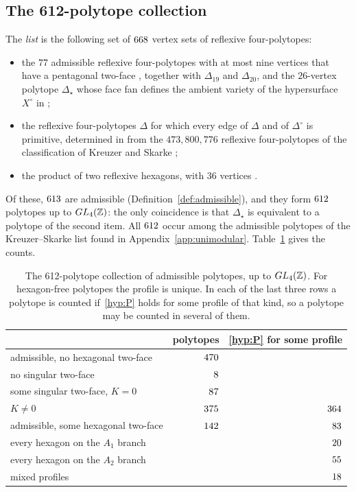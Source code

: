 \subsection{The 612-polytope collection}\label{ssec:list}
The \emph{list} is the following set of $668$ vertex sets of reflexive four-polytopes:
\begin{itemize}
\item the $77$ admissible reflexive four-polytopes with at most nine vertices that have a pentagonal two-face
\cite{Paper4}, together with $\Delta_{19}$ and $\Delta_{20}$, and the $26$-vertex polytope $\Delta_\star$
whose face fan defines the ambient variety of the hypersurface $X^\circ$ in \cite{Paper4};
\item the reflexive four-polytopes $\Delta$ for which every edge of $\Delta$ and of $\Delta^\circ$ is primitive, determined in
\cite{Paper3} from the $473{,}800{,}776$ reflexive four-polytopes of the classification of Kreuzer and Skarke
\cite{KS00};
\item the product of two reflexive hexagons, with $36$ vertices \cite{Paper3}.
\end{itemize}
Of these, $613$ are admissible (Definition~\ref{def:admissible}), and they form $612$ polytopes up to $GL_4(\mathbb Z)$:
the only coincidence is that $\Delta_\star$ is equivalent to a polytope of the second item. All $612$ occur among the
admissible polytopes of the Kreuzer--Skarke list found in Appendix~\ref{app:unimodular}.
Table~\ref{tab:list} gives the counts.

\begin{table}[ht]
\centering\small
\begin{tabular}{lrr}
& polytopes & \ref{hyp:P} for some profile\\\hline
admissible, no hexagonal two-face & $470$ & \\
\quad no singular two-face & $8$ & \\
\quad some singular two-face, $K=0$ & $87$ & \\
\quad $K\neq0$ & $375$ & $364$\\
admissible, some hexagonal two-face & $142$ & $83$\\
\quad every hexagon on the $A_1$ branch & & $20$\\
\quad every hexagon on the $A_2$ branch & & $55$\\
\quad mixed profiles & & $18$
\end{tabular}
\caption{The 612-polytope collection of admissible polytopes, up to $GL_4(\mathbb Z)$. For hexagon-free polytopes the profile is unique. In
each of the last three rows a polytope is counted if~\ref{hyp:P} holds for some profile of that kind, so a polytope may be
counted in several of them.}\label{tab:list}
\end{table}

